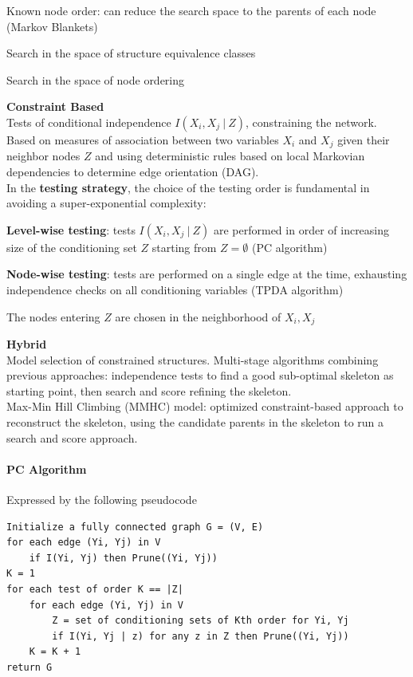 \documentclass[10pt]{report}
\begin{document}
\begin{list}{}{}
\begin{multicols}{2}
\begin{list}{}{}
		\item Known node order: can reduce the search space to the parents of each node (Markov Blankets)
		\item Search in the space of structure equivalence classes
		\item Search in the space of node ordering
	\end{list}
	\end{multicols}
	\item \textbf{Constraint Based}\\
	Tests of conditional independence $I(X_i,X_j\:|\:Z)$, constraining the network. Based on measures of association between two variables $X_i$ and $X_j$ given their neighbor nodes $Z$ and using deterministic rules based on local Markovian dependencies to determine edge orientation (DAG).\\
	In the \textbf{testing strategy}, the choice of the testing order is fundamental in avoiding a super-exponential complexity:\begin{list}{}{}
		\item \textbf{Level-wise testing}: tests $I(X_i,X_j\:|\:Z)$ are performed in order of increasing size of the conditioning set $Z$ starting from $Z = \emptyset$ (PC algorithm)
		\item \textbf{Node-wise testing}: tests are performed on a single edge at the time, exhausting independence checks on all conditioning variables (TPDA algorithm)
	\end{list}
	The nodes entering $Z$ are chosen in the neighborhood of $X_i,X_j$
	\item \textbf{Hybrid}\\
	Model selection of constrained structures. Multi-stage algorithms combining previous approaches: independence tests to find a good sub-optimal skeleton as starting point, then search and score refining the skeleton.\\
	Max-Min Hill Climbing (MMHC) model: optimized constraint-based approach to reconstruct the skeleton, using the candidate parents in the skeleton to run a search and score approach.
\end{list}
\paragraph{PC Algorithm} Expressed by the following pseudocode
\begin{lstlisting}
Initialize a fully connected graph G = (V, E)
for each edge (Yi, Yj) in V
	if I(Yi, Yj) then Prune((Yi, Yj))
K = 1
for each test of order K == |Z|
	for each edge (Yi, Yj) in V
		Z = set of conditioning sets of Kth order for Yi, Yj
		if I(Yi, Yj | z) for any z in Z then Prune((Yi, Yj))
	K = K + 1
return G
\end{lstlisting}
\end{document}
